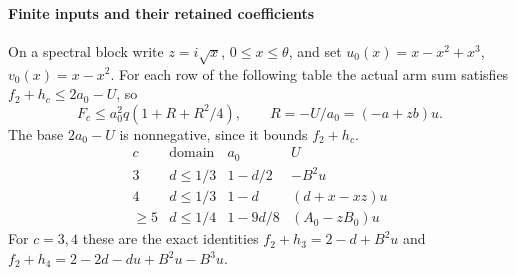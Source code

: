 \paragraph{Finite inputs and their retained coefficients}
\label{part:R40.8}
On a spectral block write \(z=i\sqrt{x}\), \(0\le x\le\theta\),
and set \(u_0(x)=x-x^2+x^3\), \(v_0(x)=x-x^2\).
For each row of the following table the actual arm sum satisfies
\(f_2+h_c\le2a_0-U\), so
\begin{equation}\label{eq:outer-unit:square}
 F_c\le a_0^2q(1+R+R^2/4),\qquad
 R=-U/a_0=(-a+zb)u.
\end{equation}
The base \(2a_0-U\) is nonnegative, since it bounds \(f_2+h_c\).
\begin{equation}\label{eq:outer-unit:inputs}
\begin{array}{c|c|c|c}
 c&\text{domain}&a_0&U\\\hline
 3&d\le1/3&1-d/2&-B^2u\\
 4&d\le1/3&1-d&(d+x-xz)u\\
 \ge5&d\le1/4&1-9d/8&(A_0-zB_0)u
\end{array}
\end{equation}
For \(c=3,4\) these are the exact identities
\(f_2+h_3=2-d+B^2u\) and
\(f_2+h_4=2-2d-du+B^2u-B^3u\).

